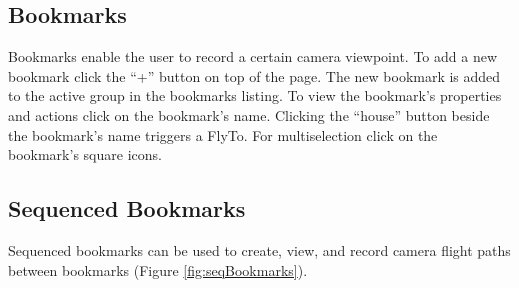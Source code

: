 
\subsection{Bookmarks}
\label{sec:bookmarks}

	
Bookmarks enable the user to record a certain camera viewpoint.
To add a new bookmark click the ``+'' button on top of the page. The new bookmark is added to the active group in the bookmarks listing.
To view the bookmark's properties and actions click on the bookmark's name. Clicking the ``house'' button beside the bookmark's name triggers a FlyTo. For multiselection click on the bookmark's square icons.

\subsection{Sequenced Bookmarks}
\label{sec:sequenced_bookmarks}

Sequenced bookmarks can be used to create, view, and record camera flight paths between bookmarks (Figure \ref{fig:seqBookmarks}). 

